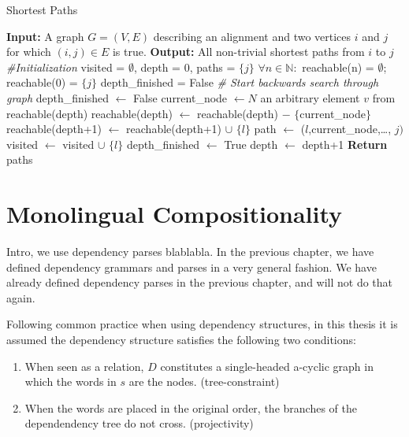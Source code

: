 \documentclass{report}
\begin{document}
\begin{algorithm}[!ht]
\caption{Shortest Paths}\label{alg:shortest paths}
\begin{algorithmic}
\STATE \textbf{Input:} A graph $G = (V,E)$ describing an alignment and two vertices $i$ and $j$ for which $(i,j)\in E$ is true.
\STATE \textbf{Output:} All non-trivial shortest paths from $i$ to $j$
\STATE \textit{\#Initialization}
\STATE visited = $\emptyset$, depth = $0$, paths = $\{j\}$
\STATE $\forall n\in\mathbb{N}:$ reachable(n) = $\emptyset$; reachable($0$) = $\{j\}$
\STATE depth\_finished = False
\STATE \textit{\# Start backwards search through graph}
		\STATE depth\_finished $\leftarrow$ False
		\STATE current\_node $\leftarrow N$ an arbitrary element $v$ from reachable(depth)
		\STATE reachable(depth) $\leftarrow$ reachable(depth) $-$ $\{$current\_node$\}$
				\STATE reachable(depth+1) $\leftarrow$ reachable(depth+1) $\cup$ $\{l\}$
					\STATE path $\leftarrow$ ($l$,current\_node,\ldots, $j)$
				\ENDFOR
			\ENDIF
		\STATE visited $\leftarrow$ visited $\cup$ $\{l\}$
		\ENDFOR
	\STATE depth\_finished $\leftarrow$ True
	\STATE depth $\leftarrow$ depth+1
	\ENDWHILE
\ENDWHILE
\STATE \textbf{Return} paths
\end{algorithmic}
\end{algorithm}


\section{Monolingual Compositionality}

Intro, we use dependency parses blablabla. In the previous chapter, we have defined dependency grammars and parses in a very general fashion. We have already defined dependency parses in the previous chapter, and will not do that again.



Following common practice when using dependency structures, in this thesis it is assumed the dependency structure satisfies the following two conditions:\begin{enumerate}
\item When seen as a relation, $D$ constitutes a single-headed a-cyclic graph in which the words in $s$ are the nodes. (tree-constraint)
\item When the words are placed in the original order, the branches of the dependendency tree do not cross. (projectivity)
\end{enumerate}
\end{document}
